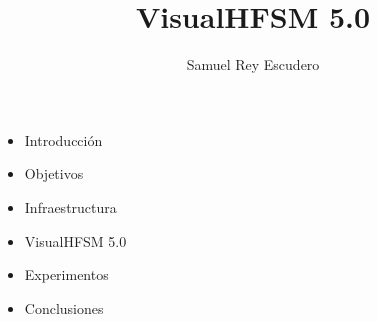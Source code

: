 \documentclass[notes,slidesec,a4]{seminar}
\title{VisualHFSM 5.0}
\author{Samuel Rey Escudero}
\begin{document}
\maketitle


\begin{hslide}
\begin{itemize}
\item Introducción 
\item Objetivos
\item Infraestructura
\item VisualHFSM 5.0
\item Experimentos
\item Conclusiones
\end{itemize}
\end{hslide}

\end{document}
